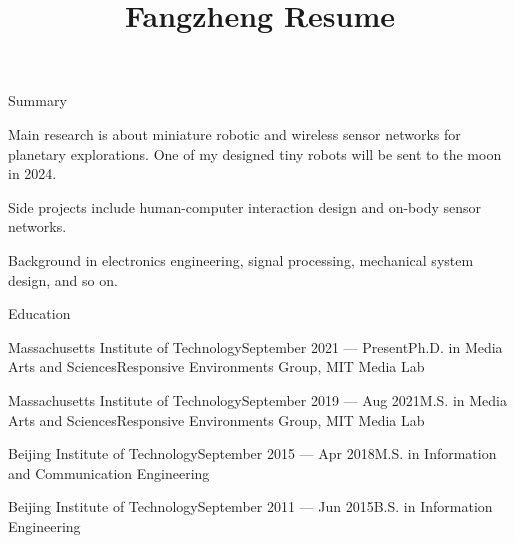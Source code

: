 \documentclass{resume} %
\begin{document}
\title{Fangzheng Resume}
\begin{rSection}{Summary}
\begin{itemlabel}
\item Main research is about miniature robotic and wireless sensor networks for planetary explorations. One of my designed tiny robots will be sent to the moon in 2024.
\item Side projects include human-computer interaction design and on-body sensor networks.
\item Background in electronics engineering, signal processing, mechanical system design, and so on.
\end{itemlabel}
\end{rSection}

\begin{rSection}{Education}

\begin{rSubsection}{Massachusetts Institute of Technology}{September 2021 --- Present}{Ph.D. in Media Arts and Sciences}{Responsive Environments Group, MIT Media Lab}
\vspace{-.65cm}
\item[]
\end{rSubsection}

\begin{rSubsection}{Massachusetts Institute of Technology}{September 2019 --- Aug 2021}{M.S. in Media Arts and Sciences}{Responsive Environments Group, MIT Media Lab}
\vspace{-.65cm}
\item[]
\end{rSubsection}

\begin{rSubsection}{Beijing Institute of Technology}{September 2015 --- Apr 2018}{M.S. in Information and Communication Engineering}{}
\vspace{-.65cm}
\item[]
\end{rSubsection}

\begin{rSubsection}{Beijing Institute of Technology}{September 2011 --- Jun 2015}{B.S. in Information Engineering}{}
\vspace{-.65cm}
\item[]
\end{rSubsection}

\end{rSection}
\end{document}
